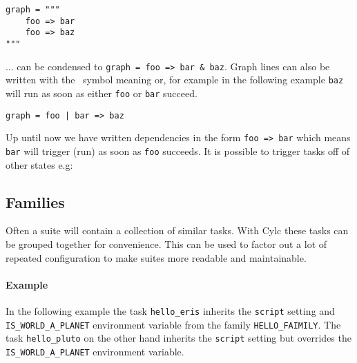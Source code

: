 \begin{lstlisting}
graph = """
    foo => bar
    foo => baz
"""
\end{lstlisting}

... can be condensed to \lstinline{graph = foo => bar & baz}.
Graph lines can also be written with the \textbar \, symbol meaning or, for
example in the following example \lstinline{baz} will run as soon as either
\lstinline{foo} or \lstinline{bar} succeed.

\begin{lstlisting}
graph = foo | bar => baz
\end{lstlisting}

Up until now we have written dependencies in the form \lstinline{foo => bar}
which means \lstinline{bar} will trigger (run) as soon as \lstinline{foo}
succeeds. It is possible to trigger tasks off of other states e.g:



\subsection{Families}
\label{Families}

Often a suite will contain a collection of similar tasks. With Cylc these
tasks can be grouped together for convenience. This can be used to factor out a lot of repeated configuration to make suites more readable and maintainable.

\paragraph*{Example}
In the following example the
task \lstinline{hello_eris} inherits the \lstinline{script} setting and
\lstinline{IS_WORLD_A_PLANET} environment variable from the family
\lstinline{HELLO_FAIMILY}. The task \lstinline{hello_pluto} on the other hand
inherits the \lstinline{script} setting but overrides the
\lstinline{IS_WORLD_A_PLANET} environment variable.

